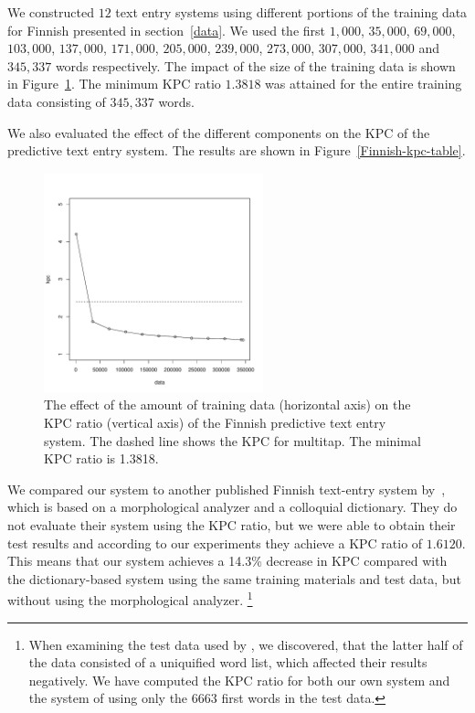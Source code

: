 \documentclass{llncs}
\begin{document}
We constructed $12$ text entry systems using different portions of the
training data for Finnish presented in section~\ref{data}. We used the
first $1,000$, $35,000$, $69,000$, $103,000$, $137,000$, $171,000$,
$205,000$, $239,000$, $273,000$, $307,000$, $341,000$ and $345,337$ words
respectively. The impact of the size of the training data is shown in
Figure~\ref{fi-kpc-graph}. The minimum KPC ratio $1.3818$ was attained
for the entire training data consisting of $345,337$ words.

We also evaluated the effect of the different components on the KPC of
the predictive text entry system. The results are shown in
Figure~\ref{Finnish-kpc-table}.

\begin{figure}[hbt!]
\begin{center}
\includegraphics[width=2.5in]{finnish_kpc_figure.pdf}
\end{center}
\caption{The effect of the amount of training data (horizontal axis)
  on the KPC ratio (vertical axis) of the Finnish predictive text
  entry system. The dashed line shows the KPC for
  multitap. The minimal KPC ratio is 1.3818.}\label{fi-kpc-graph}
\end{figure}

We compared our system to another published Finnish text-entry system
by~\cite{silfverberg/2011/cla}, which is based on a morphological
analyzer and a colloquial dictionary. They do not evaluate their
system using the KPC ratio, but we were able to obtain their test
results and according to our experiments they achieve a KPC ratio of
$1.6120$. This means that our system achieves a 14.3\% decrease in KPC
compared with the dictionary-based system using the same training
materials and test data, but without using the morphological
analyzer. \footnote{When examining the test data used by
  \cite{silfverberg/2011/cla}, we discovered, that the latter half of
  the data consisted of a uniquified word list, which affected their
  results negatively. We have computed the KPC ratio for both our own
  system and the system of \cite{silfverberg/2011/cla} using only the
  $6663$ first words in the test data.}
\end{document}
